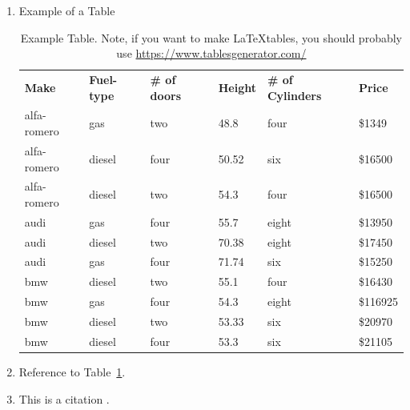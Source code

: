 \documentclass{article}
\begin{document}
\begin{enumerate}
\begin{enumerate}
    \item Example of a Table
    \begin{table}[H]
    \centering
    \caption{Example Table. Note, if you want to make \LaTeX tables, you should probably use \url{https://www.tablesgenerator.com/}}
    \label{automobile}
    \begin{tabular}{llllll}
    \\
     \textbf{Make} & \textbf{Fuel-type} & \textbf{\# of doors} & \textbf{Height}& \textbf{\# of Cylinders}& \textbf{Price} \\
    alfa-romero	& gas	& two &	48.8	&four&	\$1349\\
    alfa-romero&	diesel&	four&	50.52&	six&	\$16500\\
    alfa-romero	&diesel	&two&	54.3&	four&	\$16500\\
    audi&	gas	&four&	55.7&	eight&	\$13950\\
    audi&	diesel&	two	&70.38&	eight&	\$17450\\
    audi&	gas	&four&	71.74&	six&	\$15250\\
    bmw	&diesel	&two&	55.1&	four&	\$16430\\
    bmw&	gas	&four&	54.3&	eight	&\$116925\\
    bmw	&diesel&	two&	53.33&	six	&\$20970\\
    bmw	&diesel&	four&	53.3&	six	&\$21105
    \end{tabular}
    \end{table}

    \item Reference to Table~\ref{automobile}.
  

    \item This is a citation \cite{ganesan2012opinion}.

\end{enumerate}

\end{enumerate}



\end{document}
